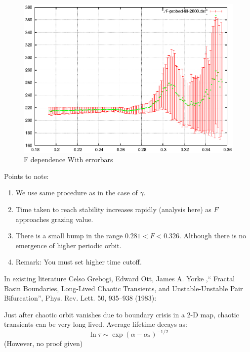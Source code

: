 \documentclass[xcolor=x11names,compress]{beamer}
\newenvironment{colbox}[1]
  {\newcommand\colboxcolor{#1}%
   \begin{lrbox}{\selvestebox}%
   \begin{minipage}{\dimexpr\columnwidth-2\fboxsep\relax}}
  {\end{minipage}\end{lrbox}%
   \begin{center}
   \colorbox[HTML]{\colboxcolor}{\usebox{\selvestebox}}
   \end{center}}
\renewcommand{\(}{\begin{columns}}
\renewcommand{\)}{\end{columns}}
\newcommand{\<}[1]{\begin{column}{#1}}
\renewcommand{\>}{\end{column}}
\begin{document}
\begin{frame}
\begin{figure}
\caption{F dependence With errorbars}%
\begin{center}
\includegraphics[width=0.9\columnwidth]{probeF-t-2000}
\end{center}
\end{figure}
\end{frame}


\begin{frame}{Points to note:}
\begin{enumerate}
\item We use same procedure as in the case of $\gamma$.  
\item Time taken to reach stability increases rapidly (analysis here) as $F$ 
approaches grazing value.  
\item There is a small bump in the range  $0.281<F<0.326$.  Although there is 
no emergence of higher periodic orbit.  
\item Remark: You must set higher time cutoff.  
\end{enumerate}
\end{frame}



\begin{frame}{In existing literature}
Celso Grebogi, Edward Ott, James A.   Yorke ,`` Fractal Basin 
Boundaries, Long-Lived Chaotic Transients, and Unstable-Unstable Pair 
Bifurcation'', Phys.   Rev.   Lett.   50, 935–938 (1983):\\



\begin{colbox}{E6E6E6}{}
Just after chaotic orbit vanishes due to boundary crisis in a 2-D map, chaotic transients 
can be very long lived. Average lifetime decays as:
\[
\ln{\tau}\sim\exp{(\alpha-\alpha_*)^{-1/2}}
\]
(However, no proof given)
\end{colbox}

\end{frame}
\end{document}
